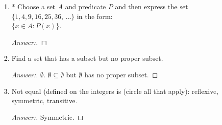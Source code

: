 \documentclass[10pt]{article}
\begin{document}
\begin{enumerate}
Using these predicates, write each of the following statements as a sentence in first-order logic:
\begin{enumerate}
\item
$\mathsf{A}$ is the only upper case English character that is a vowel and that can be written in three strokes but does not occur in the string $\mathsf{STUPID}$.
\begin{proof}[Answer:]
$\forall x \in L: \> V(x) \land S(x, 3) \land \lnot O(x, \mathsf{STUPID}) \rightarrow E(x, \mathsf{A})$
\end{proof}
\item
There is an upper case English character strictly between $\mathsf{K}$ and $\mathsf{R}$ that can be written in one stroke.
\begin{proof}[Answer:]
$\exists x \in L: B(x, \mathsf{R}) \land \lnot B(x, \mathsf{L}) \land S(x, 1)$
\end{proof}
\end{enumerate}



\item
* Choose a set $A$ and predicate $P$ and then express the set $\{1, 4, 9, 16, 25, 36, \, \ldots \}$ in the form: \\
$\{x \in A : P(x)\}$.
\begin{proof}[Answer:]
\end{proof}



\item
Find a set that has a subset but no proper subset.
\begin{proof}[Answer:]
$\emptyset$.  $\emptyset \subseteq \emptyset$ but $\emptyset$ has no proper subset.
\end{proof}



\pagebreak
\addtocounter{enumi}{1}
\item
Not equal (defined on the integers is (circle all that apply): reflexive, symmetric, transitive. 
\begin{proof}[Answer:]
Symmetric.
\end{proof}



\end{enumerate}
\end{document}
